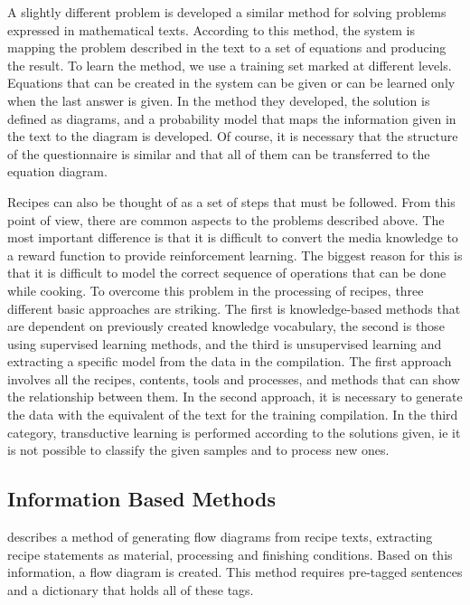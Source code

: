 A slightly different problem is \cite{hosseini2014learning} developed a similar method for solving problems expressed in mathematical texts. According to this method, the system is mapping the problem described in the text to a set of equations and producing the result. To learn the method, we use a training set marked at different levels. Equations that can be created in the system can be given or can be learned only when the last answer is given. In the method they developed, the solution is defined as diagrams, and a probability model that maps the information given in the text to the diagram is developed. Of course, it is necessary that the structure of the questionnaire is similar and that all of them can be transferred to the equation diagram.

Recipes can also be thought of as a set of steps that must be followed. From this point of view, there are common aspects to the problems described above. The most important difference is that it is difficult to convert the media knowledge to a reward function to provide reinforcement learning. The biggest reason for this is that it is difficult to model the correct sequence of operations that can be done while cooking. To overcome this problem in the processing of recipes, three different basic approaches are striking. The first is knowledge-based methods that are dependent on previously created knowledge vocabulary, the second is those using supervised learning methods, and the third is unsupervised learning and extracting a specific model from the data in the compilation. The first approach involves all the recipes, contents, tools and processes, and methods that can show the relationship between them. In the second approach, it is necessary to generate the data with the equivalent of the text for the training compilation. In the third category, transductive learning is performed according to the solutions given, ie it is not possible to classify the given samples and to process new ones.

\subsection{Information Based Methods}

\cite{walter2011workflow} describes a method of generating flow diagrams from recipe texts, extracting recipe statements as material, processing and finishing conditions. Based on this information, a flow diagram is created. This method requires pre-tagged sentences and a dictionary that holds all of these tags.


